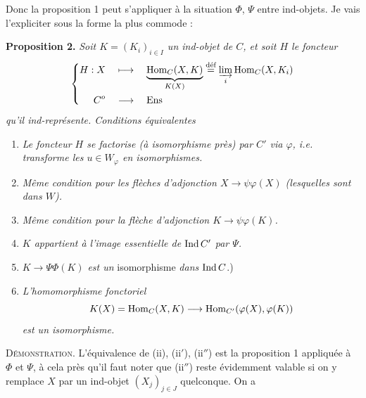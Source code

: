 Donc la proposition 1 peut s'appliquer à la situation $\Phi$, $\Psi$ entre ind-objets. Je vais l'expliciter sous la forme la plus commode :

\textbf{Proposition 2.} \textit{Soit $K = (K_i)_{i\in I}$ un ind-objet de $C$, et soit $H$ le foncteur}
\[
\left\{
\begin{aligned}
H : X \quad &\longmapsto \quad \underbrace{\mathrm{Hom}_C(X,K)}_{K(X)} \overset{\text{déf}}{=} \varinjlim_i \mathrm{Hom}_C(X,K_i)\\
C^o \quad &\longrightarrow \quad \mathrm{Ens}
\end{aligned}
\right.
\]
\textit{qu'il ind-représente. Conditions équivalentes}

\begin{enumerate}[label={}]
\item[(i)] \textit{Le foncteur $H$ se factorise (à isomorphisme près) par $C'$ via $\varphi$, i.e. transforme les $u \in W_\varphi$ en isomorphismes.}
\item[(i$'$)] \textit{Même condition pour les flèches d'adjonction $X \longrightarrow \psi\varphi(X)$ (lesquelles sont dans $W$).}
\item[(i$''$)] \textit{Même condition pour la flèche d'adjonction $K \longrightarrow \psi\varphi(K)$.}
\item[(ii)] \textit{$K$ appartient à l'image essentielle de} $\operatorname{Ind} C'$ \textit{par $\Psi$.}
\item[(ii$'$)] $K \longrightarrow \Psi\Phi(K)$ \textit{est un} isomorphisme \textit{dans} $\operatorname{Ind} C$.) %
\item[(ii$''$)] \textit{L'homomorphisme fonctoriel}
\[
K(X) = \mathrm{Hom}_C(X,K) \longrightarrow \mathrm{Hom}_{C'}(\varphi(X),\varphi(K))
\]
 \textit{est un isomorphisme.}
\end{enumerate}

\textsc{Démonstration.} L'équivalence de (ii), (ii$'$), (ii$''$) est la proposition 1 appliquée à $\Phi$ et $\Psi$, à cela près qu'il faut noter que (ii$''$) reste évidemment valable si on y remplace $X$ par un ind-objet $(X_j)_{j\in J}$ quelconque. On a


